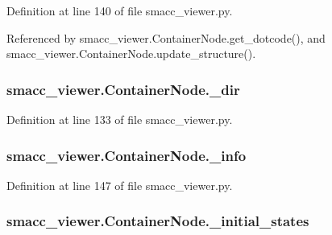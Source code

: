 Definition at line 140 of file smacc\+\_\+viewer.\+py.



Referenced by smacc\+\_\+viewer.\+Container\+Node.\+get\+\_\+dotcode(), and smacc\+\_\+viewer.\+Container\+Node.\+update\+\_\+structure().

\subsubsection[{\texorpdfstring{\+\_\+dir}{_dir}}]{\setlength{\rightskip}{0pt plus 5cm}smacc\+\_\+viewer.\+Container\+Node.\+\_\+dir\hspace{0.3cm}{\ttfamily [private]}}\hypertarget{classsmacc__viewer_1_1ContainerNode_a2a6efbc2a25f65b830415ee994408ca0}{}\label{classsmacc__viewer_1_1ContainerNode_a2a6efbc2a25f65b830415ee994408ca0}


Definition at line 133 of file smacc\+\_\+viewer.\+py.

\subsubsection[{\texorpdfstring{\+\_\+info}{_info}}]{\setlength{\rightskip}{0pt plus 5cm}smacc\+\_\+viewer.\+Container\+Node.\+\_\+info\hspace{0.3cm}{\ttfamily [private]}}\hypertarget{classsmacc__viewer_1_1ContainerNode_a1e3dcba4beb3738d72e57805b7d2474b}{}\label{classsmacc__viewer_1_1ContainerNode_a1e3dcba4beb3738d72e57805b7d2474b}


Definition at line 147 of file smacc\+\_\+viewer.\+py.

\subsubsection[{\texorpdfstring{\+\_\+initial\+\_\+states}{_initial_states}}]{\setlength{\rightskip}{0pt plus 5cm}smacc\+\_\+viewer.\+Container\+Node.\+\_\+initial\+\_\+states\hspace{0.3cm}{\ttfamily [private]}}\hypertarget{classsmacc__viewer_1_1ContainerNode_a3d5c9521ab4377e7b94e437d4f7e5a83}{}\label{classsmacc__viewer_1_1ContainerNode_a3d5c9521ab4377e7b94e437d4f7e5a83}


